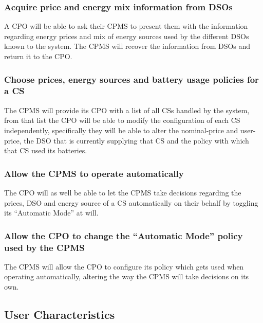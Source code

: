 \documentclass[11pt]{article}
\begin{document}
\subsubsection{Acquire price and energy mix information from DSOs}

A CPO will be able to ask their CPMS to present them with the information regarding energy prices and mix of energy sources used by the different DSOs known to the system. The CPMS will recover the information from DSOs and return it to the CPO.

\subsubsection{Choose prices, energy sources and battery usage policies for a CS}

The CPMS will provide its CPO with a list of all CSs handled by the system, from that list the CPO will be able to modify the configuration of each CS independently, specifically they will be able to alter the nominal-price and user-price, the DSO that is currently supplying that CS and the policy with which that CS used its batteries.

\subsubsection{Allow the CPMS to operate automatically}

The CPO will as well be able to let the CPMS take decisions regarding the prices, DSO and energy source of a CS automatically on their behalf by toggling its “Automatic Mode” at will.

\subsubsection{Allow the CPO to change the “Automatic Mode” policy used by the CPMS}

The CPMS will allow the CPO to configure its policy which gets used when operating automatically, altering the way the CPMS will take decisions on its own.

\subsection{User Characteristics}
\end{document}
